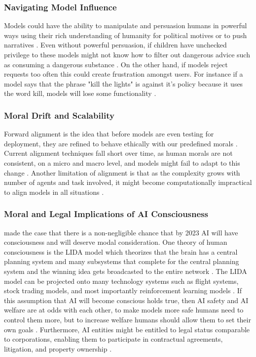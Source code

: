 \subsubsection{Navigating Model Influence}

Models could have the ability to manipulate and persuasion humans in powerful ways using their rich understanding of humanity for political motives or to push narratives \citep{shevlane_model_2023}. Even without powerful persuasion, if children have unchecked privilege to these models might not know how to filter out dangerous advice such as consuming a dangerous substance \citep{mei_mitigating_2022, mei_assert_2023}. On the other hand, if models reject requests too often this could create frustration amongst users. For instance if a model says that the phrase "kill the lights" is against it's policy because it uses the word kill, models will lose some functionality \citep{rottger_xstest_2024}.

\subsubsection{Moral Drift and Scalability}
Forward alignment is the idea that before models are even testing for deployment, they are refined to behave ethically with our predefined morals \citep{ji_ai_2023}. Current alignment techniques fall short over time, as human morals are not consistent, on a micro and macro level, and models might fail to adapt to this change \citep{carroll_ai_2024}. Another limitation of alignment is that as the complexity grows with number of agents and task involved, it might become computationally impractical to align models in all situations \citep{nayebi_barriers_2025}.

\subsubsection{Moral and Legal Implications of AI Consciousness}
\cite{sebo_moral_2025} made the case that there is a non-negligible chance that by 2023 AI will have consciousness and will deserve modal consideration. One theory of human consciousness is the LIDA model which theorizes that the brain has a central planning system and many subsystems that complete for the central planning system and the winning idea gets broadcasted to the entire network \citep{franklin_lida_2013}. The LIDA model can be projected onto many technology systems such as flight systems, stock trading models, and most importantly reinforcement learning models \citep{tomasik_dialogue_2015}.
If this assumption that AI will become conscious holds true, then AI safety and AI welfare are at odds with each other, to make models more safe humans need to control them more, but to increase welfare humans should allow them to set their own goals \citep{sebo_moral_2025, caviola_how_2024}. Furthermore, AI entities might be entitled to legal status comparable to corporations, enabling them to participate in contractual agreements, litigation, and property ownership \cite{ward_towards_2025}.

